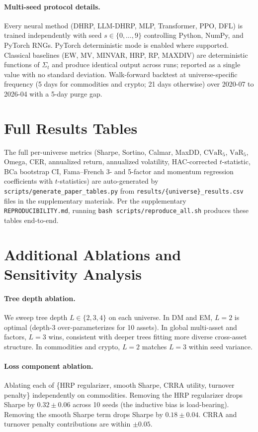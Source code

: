 \paragraph{Multi-seed protocol details.} Every neural method (DHRP,
LLM-DHRP, MLP, Transformer, PPO, DFL) is trained independently with
seed $s \in \{0, \ldots, 9\}$ controlling Python, NumPy, and PyTorch
RNGs. PyTorch deterministic mode is enabled where supported. Classical
baselines (EW, MV, MINVAR, HRP, RP, MAXDIV) are deterministic functions
of $\Sigma_t$ and produce identical output across runs; reported as a
single value with no standard deviation. Walk-forward backtest at
universe-specific frequency (5 days for commodities and crypto;
21 days otherwise) over 2020-07 to 2026-04 with a 5-day purge gap.

\section{Full Results Tables}
\label{app:full_tables}

The full per-universe metrics (Sharpe, Sortino, Calmar, MaxDD,
$\text{CVaR}_5$, $\text{VaR}_5$, Omega, CER, annualized return,
annualized volatility, HAC-corrected $t$-statistic, BCa bootstrap CI,
Fama--French 3- and 5-factor and momentum regression coefficients with
$t$-statistics) are auto-generated by
\texttt{scripts/generate\_paper\_tables.py} from
\texttt{results/\{universe\}\_results.csv} files in the supplementary
materials. Per the supplementary \texttt{REPRODUCIBILITY.md}, running
\texttt{bash scripts/reproduce\_all.sh} produces these tables
end-to-end.

\section{Additional Ablations and Sensitivity Analysis}
\label{app:additional}

\paragraph{Tree depth ablation.}
We sweep tree depth $L \in \{2, 3, 4\}$ on each universe. In DM and
EM, $L = 2$ is optimal (depth-3 over-parameterizes for 10 assets). In
global multi-asset and factors, $L = 3$ wins, consistent with deeper
trees fitting more diverse cross-asset structure. In commodities and
crypto, $L = 2$ matches $L = 3$ within seed variance.

\paragraph{Loss component ablation.}
Ablating each of \{HRP regularizer, smooth Sharpe, CRRA utility,
turnover penalty\} independently on commodities. Removing the HRP
regularizer drops Sharpe by $0.32 \pm 0.06$ across 10 seeds (the
inductive bias is load-bearing). Removing the smooth Sharpe term drops
Sharpe by $0.18 \pm 0.04$. CRRA and turnover penalty contributions are
within $\pm 0.05$.

